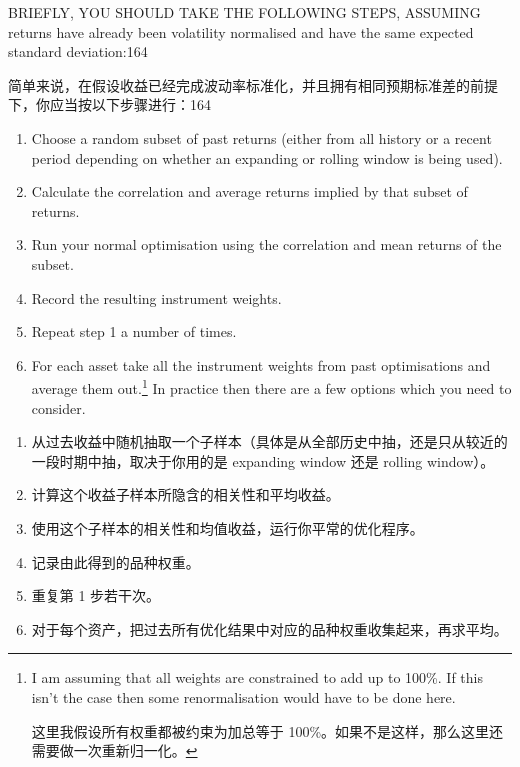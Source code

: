 


\begin{englishblock} BRIEFLY, YOU SHOULD TAKE THE FOLLOWING STEPS, ASSUMING returns have already been volatility normalised and have the same expected standard deviation:164 \end{englishblock}

\begin{chineseblock}简单来说，在假设收益已经完成波动率标准化，并且拥有相同预期标准差的前提下，你应当按以下步骤进行：164 \end{chineseblock}

\begin{enumerate}
\item Choose a random subset of past returns (either from all history or a recent period depending on whether an expanding or rolling window is being used).
\item Calculate the correlation and average returns implied by that subset of returns.
\item Run your normal optimisation using the correlation and mean returns of the subset.
\item Record the resulting instrument weights.
\item Repeat step 1 a number of times.
\item For each asset take all the instrument weights from past optimisations and average them out.\footnote{I am assuming that all weights are constrained to add up to 100\%. If this isn't the case then some renormalisation would have to be done here. \par 这里我假设所有权重都被约束为加总等于 100\%。如果不是这样，那么这里还需要做一次重新归一化。} In practice then there are a few options which you need to consider. \end{enumerate}

\begin{enumerate}
\item 从过去收益中随机抽取一个子样本（具体是从全部历史中抽，还是只从较近的一段时期中抽，取决于你用的是 expanding window 还是 rolling window）。
\item 计算这个收益子样本所隐含的相关性和平均收益。
\item 使用这个子样本的相关性和均值收益，运行你平常的优化程序。
\item 记录由此得到的品种权重。
\item 重复第 1 步若干次。
\item 对于每个资产，把过去所有优化结果中对应的品种权重收集起来，再求平均。\end{enumerate}

